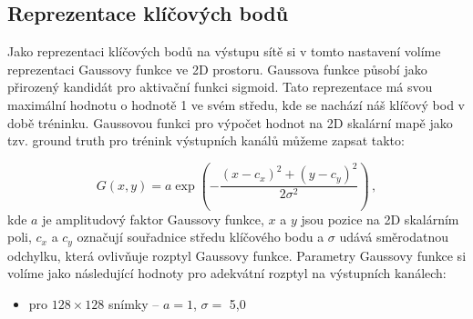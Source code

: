 \subsection{Reprezentace klíčových bodů}

Jako reprezentaci klíčových bodů na výstupu sítě si v tomto nastavení volíme reprezentaci Gaussovy funkce ve 2D prostoru. Gaussova funkce působí jako přirozený kandidát pro aktivační funkci sigmoid. Tato reprezentace má svou maximální hodnotu o hodnotě 1 ve svém středu, kde se nachází náš klíčový bod v době tréninku. Gaussovou funkci pro výpočet hodnot na 2D skalární mapě jako tzv. ground truth pro trénink výstupních kanálů můžeme zapsat takto:

\begin{equation}
    G(x, y) = a \exp\left(-\frac{(x - c_x)^2 + (y - c_y)^2}{2\sigma^2}\right)\,,
\end{equation}
kde $a$ je amplitudový faktor Gaussovy funkce, $x$ a $y$ jsou pozice na 2D skalárním poli, $c_x$ a $c_y$ označují souřadnice středu klíčového bodu a $\sigma$ udává směrodatnou odchylku, která ovlivňuje rozptyl Gaussovy funkce. Parametry Gaussovy funkce si volíme jako následující hodnoty pro adekvátní rozptyl na výstupních kanálech: 
\begin{itemize}
    \item pro $128 \times 128$ snímky -- $a=1$, $\sigma=$ 5,0
\end{itemize}

